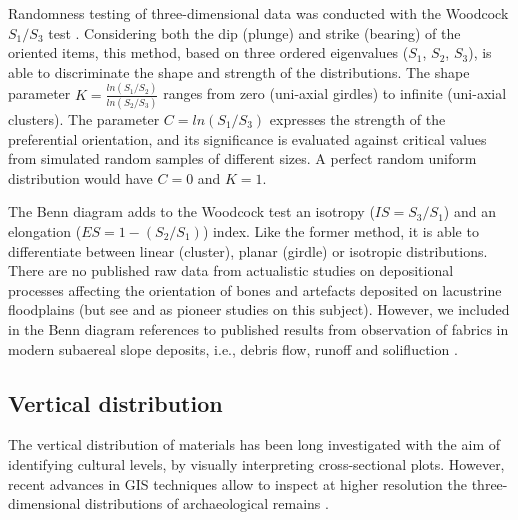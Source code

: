 \documentclass[preprint,authoryear,times]{elsarticle} %
\begin{document}
Randomness testing of three-dimensional data was conducted with the Woodcock $S_1/S_3$ test \citep{Woodcock1983}. Considering both the dip (plunge) and strike (bearing) of the oriented items, this method, based on three ordered eigenvalues ($S_1$, $S_2$, $S_3$), is able to discriminate the shape and strength of the distributions. The shape parameter $K=\frac{ln(S_1/S_2)}{ln(S_2/S_3)}$ ranges from zero (uni-axial girdles) to infinite (uni-axial clusters). The parameter $C=ln(S_1/S_3)$ expresses the strength of the preferential orientation, and its significance is evaluated against critical values from simulated random samples of different sizes. A perfect random uniform distribution would have $C=0$ and $K=1$.

The Benn \citep{Benn1994} diagram adds to the Woodcock test an isotropy ($IS=S_3/S_1$) and an elongation ($ES=1-(S_2/S_1)$) index. Like the former method, it is able to differentiate between linear (cluster), planar (girdle) or isotropic distributions. There are no published raw data from actualistic studies on depositional processes affecting the orientation of bones and artefacts deposited on lacustrine floodplains (but see \cite{Morton2004} and \cite{Cobo-Sanchez2014} as pioneer studies on this subject). However, we included in the Benn diagram references to published results from observation of fabrics in modern subaereal slope deposits, i.e., debris flow, runoff and solifluction \citep{Bertran1997,Lenoble2004}.

\subsection{Vertical distribution}

The vertical distribution of materials has been long investigated with the aim of identifying cultural levels, by visually interpreting cross-sectional plots. However, recent advances in GIS techniques allow to inspect at higher resolution the three-dimensional distributions of archaeological remains \citep[][among others]{McPherron2005a,Anderson2008}.

\end{document}
